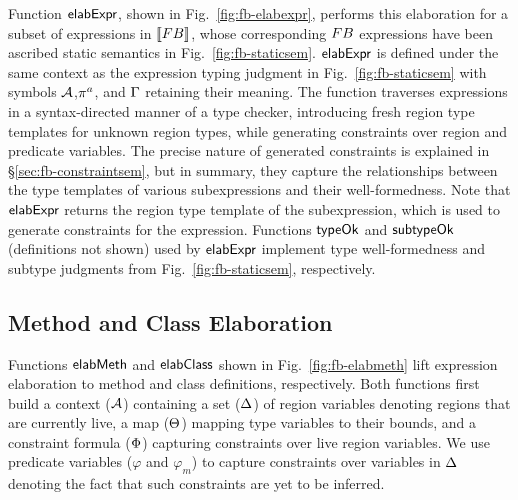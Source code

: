 



Function ${\sf elabExpr}$, shown in Fig.~\ref{fig:fb-elabexpr}, performs
this elaboration for a subset of expressions in $\llbracket {\sc FB} \rrbracket$, whose
corresponding ${\sc FB}$ expressions have been ascribed static semantics in
Fig.~\ref{fig:fb-staticsem}. ${\sf elabExpr}$ is defined under the same
context as the expression typing judgment in
Fig.~\ref{fig:fb-staticsem} with symbols ${\mathcal{A}}$,$\pi^a$, and $\Gamma$
retaining their meaning. The function traverses expressions in a
syntax-directed manner of a type checker, introducing fresh region
type templates for unknown region types, while generating constraints
over region and predicate variables. The precise nature of generated
constraints is explained in \S\ref{sec:fb-constraintsem}, but in
summary, they capture the relationships between the type templates of
various subexpressions and their well-formedness. Note that
${\sf elabExpr}$ returns the region type template of the subexpression,
which is used to generate constraints for the expression. Functions
${\sf typeOk}$ and ${\sf subtypeOk}$ (definitions not shown) used by ${\sf elabExpr}$
implement type well-formedness and subtype judgments from
Fig.~\ref{fig:fb-staticsem}, respectively.

\subsection{Method and Class Elaboration}

Functions ${\sf elabMeth}$ and ${\sf elabClass}$ shown in
Fig.~\ref{fig:fb-elabmeth} lift expression elaboration to method and
class definitions, respectively. Both functions first build a context
(${\mathcal{A}}$) containing a set ($ \Delta$) of region variables denoting
regions that are currently live, a map ($\Theta$) mapping type
variables to their bounds, and a constraint formula ($\Phi$)
capturing constraints over live region variables. We use predicate
variables ($\varphi$ and $\varphi_m$) to capture constraints over
variables in $\Delta$ denoting the fact that such constraints are yet
to be inferred.


